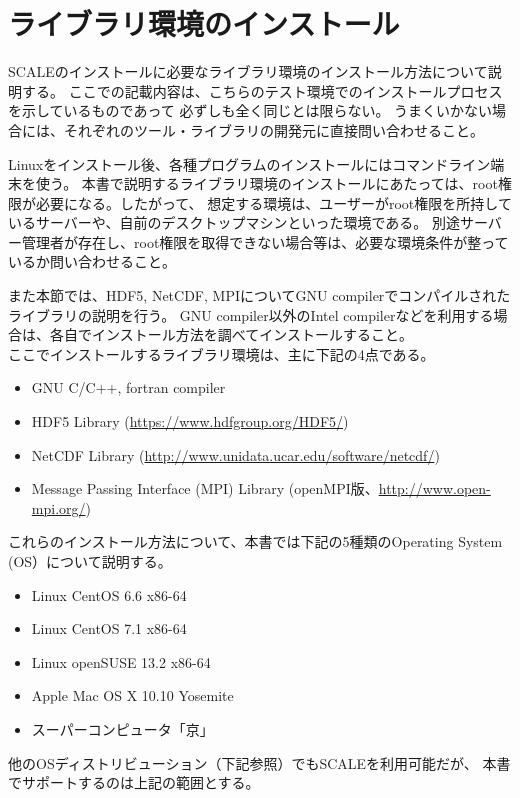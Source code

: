 \chapter{ライブラリ環境のインストール}
\label{sec:env_setting}

SCALEのインストールに必要なライブラリ環境のインストール方法について説明する。
ここでの記載内容は、こちらのテスト環境でのインストールプロセスを示しているものであって
必ずしも全く同じとは限らない。
うまくいかない場合には、それぞれのツール・ライブラリの開発元に直接問い合わせること。


Linuxをインストール後、各種プログラムのインストールにはコマンドライン端末を使う。
本書で説明するライブラリ環境のインストールにあたっては、root権限が必要になる。したがって、
想定する環境は、ユーザーがroot権限を所持しているサーバーや、自前のデスクトップマシンといった環境である。
別途サーバー管理者が存在し、root権限を取得できない場合等は、必要な環境条件が整っているか問い合わせること。

また本節では、HDF5, NetCDF, MPIについてGNU compilerでコンパイルされたライブラリの説明を行う。
GNU compiler以外のIntel compilerなどを利用する場合は、各自でインストール方法を調べてインストールすること。\\

\noindent ここでインストールするライブラリ環境は、主に下記の4点である。
\begin{itemize}
\item GNU C/C++, fortran compiler
\item HDF5 Library (\url{https://www.hdfgroup.org/HDF5/})
\item NetCDF Library (\url{http://www.unidata.ucar.edu/software/netcdf/})
\item Message Passing Interface (MPI) Library (openMPI版、\url{http://www.open-mpi.org/})
\end{itemize}
これらのインストール方法について、本書では下記の5種類のOperating System (OS）について説明する。
\begin{itemize}
\item Linux CentOS 6.6 x86-64
\item Linux CentOS 7.1 x86-64
\item Linux openSUSE 13.2 x86-64
\item Apple Mac OS X 10.10 Yosemite
\item スーパーコンピュータ「京」
\end{itemize}
他のOSディストリビューション（下記参照）でもSCALEを利用可能だが、
本書でサポートするのは上記の範囲とする。\\

